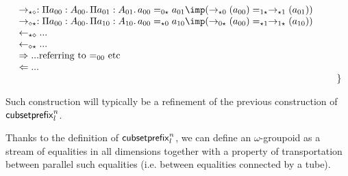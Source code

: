 \documentclass{article}
\begin{document}
$$\begin{array}{lll}
\begin{array}{l}
\rightarrow_{\star\diamond} : \Pi a_{00}:A_{00}.\,\Pi a_{01}:A_{01}.\, a_{00} =_{0\star} a_{01} \imp (\rightarrow_{\star 0}(a_{00}) =_{1\star} \rightarrow_{\star 1}(a_{01}))\\
\rightarrow_{\diamond\star} : \Pi a_{00}:A_{00}.\,\Pi a_{10}:A_{10}.\, a_{00} =_{\star 0} a_{10} \imp (\rightarrow_{0\star}(a_{00}) =_{\star 1} \rightarrow_{1 \star}(a_{10}))\\
\leftarrow_{\star\diamond} ...\\
\leftarrow_{\diamond\star} ...\\
\Rightarrow ... \mbox{referring to $=_{00}$ etc}\\
\Leftarrow ...\\
\end{array}\\
&&\}\\
\end{array}
$$

Such construction will typically be a refinement of the previous
construction of $\mathsf{cubsetprefix}_{l}^n$.
\fi

\iffalse
Thanks to the definition of $\mathsf{cubsetprefix}_{l}^n$, we can define an $\omega$-groupoid
as a stream of equalities in all dimensions together with a property
of transportation between parallel such equalities (i.e. between
equalities connected by a tube).
\end{document}
